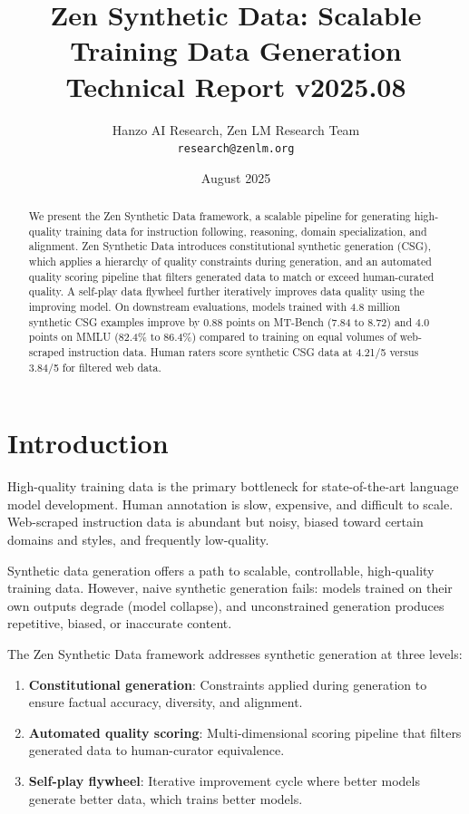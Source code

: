 \documentclass[11pt,a4paper]{article}
\title{\textbf{Zen Synthetic Data: Scalable Training Data Generation}\\
\large Technical Report v2025.08}
\author{Hanzo AI Research, Zen LM Research Team\\
\texttt{research@zenlm.org}}
\date{August 2025}
\begin{document}
\maketitle

\begin{abstract}
We present the Zen Synthetic Data framework, a scalable pipeline for generating high-quality training data for instruction following, reasoning, domain specialization, and alignment. Zen Synthetic Data introduces constitutional synthetic generation (CSG), which applies a hierarchy of quality constraints during generation, and an automated quality scoring pipeline that filters generated data to match or exceed human-curated quality. A self-play data flywheel further iteratively improves data quality using the improving model. On downstream evaluations, models trained with 4.8 million synthetic CSG examples improve by 0.88 points on MT-Bench (7.84 to 8.72) and 4.0 points on MMLU (82.4\% to 86.4\%) compared to training on equal volumes of web-scraped instruction data. Human raters score synthetic CSG data at 4.21/5 versus 3.84/5 for filtered web data.
\end{abstract}

\section{Introduction}

High-quality training data is the primary bottleneck for state-of-the-art language model development. Human annotation is slow, expensive, and difficult to scale. Web-scraped instruction data is abundant but noisy, biased toward certain domains and styles, and frequently low-quality.

Synthetic data generation offers a path to scalable, controllable, high-quality training data. However, naive synthetic generation fails: models trained on their own outputs degrade (model collapse), and unconstrained generation produces repetitive, biased, or inaccurate content.

The Zen Synthetic Data framework addresses synthetic generation at three levels:

\begin{enumerate}
  \item \textbf{Constitutional generation}: Constraints applied during generation to ensure factual accuracy, diversity, and alignment.
  \item \textbf{Automated quality scoring}: Multi-dimensional scoring pipeline that filters generated data to human-curator equivalence.
  \item \textbf{Self-play flywheel}: Iterative improvement cycle where better models generate better data, which trains better models.
\end{enumerate}
\end{document}

